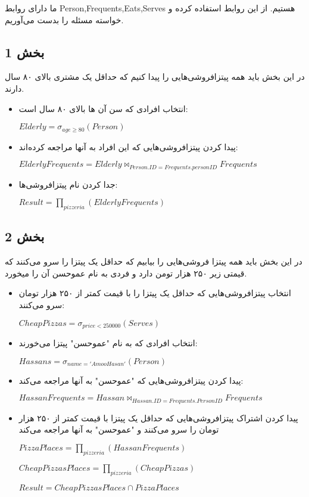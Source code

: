 ما دارای روابط Person,Frequents,Eats,Serves هستیم. از این روابط استفاده کرده و خواسته مسئله را بدست می‌آوریم.
\subsection*{بخش 1}
در این بخش باید همه پیتزافروشی‌هایی را پیدا کنیم که حداقل یک مشتری بالای ۸۰ سال دارند.
\begin{itemize}	
	\item انتخاب افرادی که سن آن ها بالای ۸۰ سال است:
	
	\setLTR
	$Elderly = \sigma_{age \geq 80} (Person)$
	\setRTL
	\item پیدا کردن پیتزافروشی‌هایی که این افراد به آنها مراجعه کرده‌اند:
	
	\setLTR
	$ElderlyFrequents = Elderly \bowtie_{Person.ID=Frequents.personID} Frequents$
	\setRTL
	
	\item جدا کردن نام پیتزافروشی‌ها:
	
	\setLTR
	$Result = \prod_{pizzeria} (ElderlyFrequents)$
	\setRTL
\end{itemize}




\subsection*{بخش 2}
در این بخش باید همه پیتزا فروشی‌هایی را بیابیم که حداقل یک پیتزا را سرو می‌کنند که قیمتی زیر ۲۵۰ هزار
تومن دارد و فردی به نام عموحسن آن را میخورد.
\begin{itemize}	
	\item انتخاب پیتزافروشی‌هایی که حداقل یک پیتزا را با قیمت کمتر از ۲۵۰ هزار تومان سرو می‌کنند:
	
	\setLTR
	$CheapPizzas = \sigma_{price < 250000} (Serves)$
	\setRTL
	
	\item انتخاب افرادی که به نام "عموحسن" پیتزا می‌خورند: 
	
	\setLTR
	$Hassans = \sigma_{name = 'AmooHasan'} (Person)$
	\setRTL
	
	\item پیدا کردن پیتزافروشی‌هایی که "عموحسن" به آنها مراجعه می‌کند: 
	
	\setLTR
	$HassanFrequents = Hassan \bowtie_{Hassan.ID=Frequents.PersonID} Frequents$
	\setRTL
	
	\item پیدا کردن اشتراک پیتزافروشی‌هایی که حداقل یک پیتزا با قیمت کمتر از ۲۵۰ هزار تومان را سرو می‌کنند و "عموحسن" به آنها مراجعه می‌کند
	
	\setLTR
	$PizzaPlaces = \prod_{pizzeria} (HassanFrequents)$
	
	$CheapPizzasPlaces = \prod_{pizzeria} (CheapPizzas)$
	
	$Result = CheapPizzasPlaces \cap PizzaPlaces$
	\setRTL

\end{itemize}





